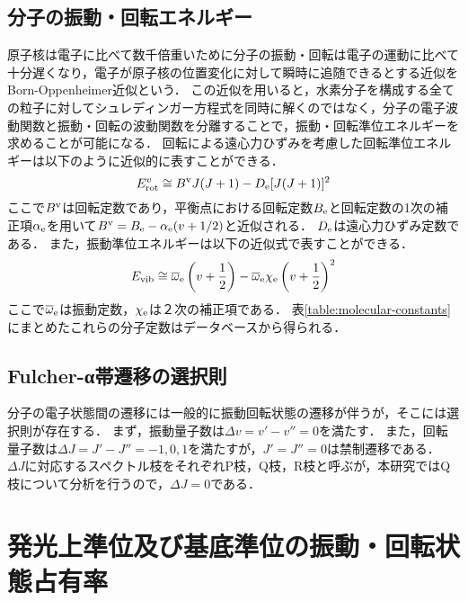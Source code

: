 \subsection{分子の振動・回転エネルギー}
原子核は電子に比べて数千倍重いために分子の振動・回転は電子の運動に比べて十分遅くなり，電子が原子核の位置変化に対して瞬時に追随できるとする近似をBorn-Oppenheimer近似という\cite{bunsibunko-no-kiso}．
この近似を用いると，水素分子を構成する全ての粒子に対してシュレディンガー方程式を同時に解くのではなく，分子の電子波動関数と振動・回転の波動関数を分離することで，振動・回転準位エネルギーを求めることが可能になる．
回転による遠心力ひずみを考慮した回転準位エネルギーは以下のように近似的に表すことができる\cite{bunsibunko-no-kiso}．
\begin{equation}
    E^v_{\rm rot} \cong B^{\rm v} J (J+1) - D_{\rm e} [J(J+1)]^2
\end{equation}
ここで$B^{\rm v}$は回転定数であり，平衡点における回転定数$B_{\rm e}$と回転定数の1次の補正項$\alpha_{\rm e}$を用いて$B^{\rm v}=B_{\rm e} - \alpha_{\rm e} (v + 1/2)$と近似される\cite{bunsibunko-no-kiso}．
$D_{\rm e}$は遠心力ひずみ定数である．
また，振動準位エネルギーは以下の近似式で表すことができる\cite{bunsibunko-no-kiso}．
\begin{equation}
    E_{\rm vib} \cong \overline{\omega}_{\rm e} \left(v + \frac{1}{2} \right) - \overline{\omega}_{\rm e} \chi_{\rm e} \left(v + \frac{1}{2} \right)^2
\end{equation}
ここで$\overline{\omega}_{\rm e}$は振動定数，$\chi_{\rm e}$は２次の補正項である．
表\ref{table:molecular-constants}にまとめたこれらの分子定数はデータベースから得られる\cite{nist}．

\subsection{Fulcher-α帯遷移の選択則}
分子の電子状態間の遷移には一般的に振動回転状態の遷移が伴うが，そこには選択則が存在する\cite{bunsibunko-no-kiso}．
まず，振動量子数は$\Delta v = v'-v'' = 0$を満たす．
また，回転量子数は$\Delta J = J' - J'' = -1,0,1$を満たすが，$J'=J''=0$は禁制遷移である．
$\Delta J$に対応するスペクトル枝をそれぞれP枝，Q枝，R枝と呼ぶが，本研究ではQ枝について分析を行うので，$\Delta J = 0$である．

\section{発光上準位及び基底準位の振動・回転状態占有率}
